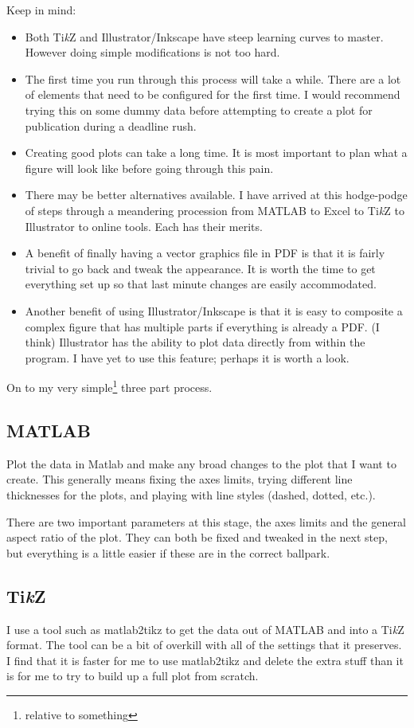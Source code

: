 \documentclass[journal,10pt]{IEEEtran}
\newcommand{\tikz}{\textup{Ti\textit{k}Z}\xspace}
\begin{document}
Keep in mind:
\begin{itemize}
	\item Both \tikz and Illustrator/Inkscape have steep learning curves to master. However doing simple modifications is not too hard.
	\item The first time you run through this process will take a while. There are a lot of elements that need to be configured for the first time. I would recommend trying this on some dummy data before attempting to create a plot for publication during a deadline rush.
	\item Creating good plots can take a long time. It is most important to plan what a figure will look like before going through this pain.
	\item There may be better alternatives available. I have arrived at this hodge-podge of steps through a meandering procession from MATLAB to Excel to \tikz to Illustrator to online tools. Each has their merits.
	\item A benefit of finally having a vector graphics file in PDF is that it is fairly trivial to go back and tweak the appearance. It is worth the time to get everything set up so that last minute changes are easily accommodated.
	\item Another benefit of using Illustrator/Inkscape is that it is easy to composite a complex figure that has multiple parts if everything is already a PDF.
(I think) Illustrator has the ability to plot data directly from within the program. I have yet to use this feature; perhaps it is worth a look.
\end{itemize}

On to my very simple\footnote{relative to something} three part process.

\subsection{MATLAB}
Plot the data in Matlab and make any broad changes to the plot that I want to create.
This generally means fixing the axes limits, trying different line thicknesses for the plots, and playing with line styles (dashed, dotted, etc.).


There are two important parameters at this stage, the axes limits and the general aspect ratio of the plot.
They can both be fixed and tweaked in the next step, but everything is a little easier if these are in the correct ballpark.

\subsection{\tikz}
I use a tool such as matlab2tikz to get the data out of MATLAB and into a \tikz format.
The tool can be a bit of overkill with all of the settings that it preserves.
I find that it is faster for me to use matlab2tikz and delete the extra stuff than it is for me to try to build up a full plot from scratch.
\end{document}

